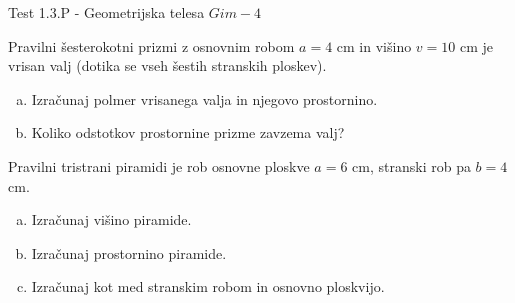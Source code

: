 \documentclass[a4paper,12pt]{letter}
\renewcommand{\headrulewidth}{3pt}
\renewcommand{\headrulewidth}{0.3pt}
\newcounter{tocke}
\begin{document}
\pagestyle{fancy}
\renewcommand\headrulewidth{0pt}
\lhead{}\chead{}\rhead{}
\rfoot{\vspace*{-2\baselineskip}}
\renewcommand{\vec}{\overrightarrow}
\def\programletnik{Gim - 4}
\def\naslov{Test 1.3.P - }
\def\sklop{Geometrijska telesa}
\def\tockeA{4+3}
\def\tockeB{3+3+4}
\def\tockeC{3+4+3}
\def\tockeD{4+4}
\begin{minipage}{20cm}
\begin{bclogo}[couleur=brown!30,
  arrondi=0,ombre=true, couleurOmbre=gray!50,
logo =\bcplume,
  noborder=true]
{\textrm{{\Large{\naslov \sklop} \Huge{}
\large{} \hfill $\programletnik$}}}
\end{bclogo}
\end{minipage}
\begin{minipage}{20cm}
\begin{bclogo}[couleur=brown!30,
  arrondi=0,ombre=true, couleurOmbre=gray!50,
logo =\bcplume,
  noborder=true]
{\textrm{{}}}
\end{bclogo}
\end{minipage}

\begin{naloga}[\hfill $\tockeA$] \addtocounter{tocke}{\numexpr\tockeA\relax}
Pravilni \v{s}esterokotni prizmi z osnovnim robom $a=4$ cm in vi\v{s}ino $v=10$ cm je vrisan valj (dotika se vseh \v{s}estih stranskih ploskev).
\begin{enumerate}[a)]
\item Izra\v{c}unaj polmer vrisanega valja in njegovo prostornino.
\item Koliko odstotkov prostornine prizme zavzema valj?
\end{enumerate}
\end{naloga}\newpage

\begin{naloga}[\hfill $\tockeB$] \addtocounter{tocke}{\numexpr\tockeB\relax}
Pravilni tristrani piramidi je rob osnovne ploskve $a=6$ cm, stranski rob pa $b=4$ cm.
\begin{enumerate}[a)]
\item Izra\v{c}unaj vi\v{s}ino piramide.
\item Izra\v{c}unaj prostornino piramide.
\item Izra\v{c}unaj kot med stranskim robom in osnovno ploskvijo.
\end{enumerate}
\end{naloga}\newpage
\end{document}

